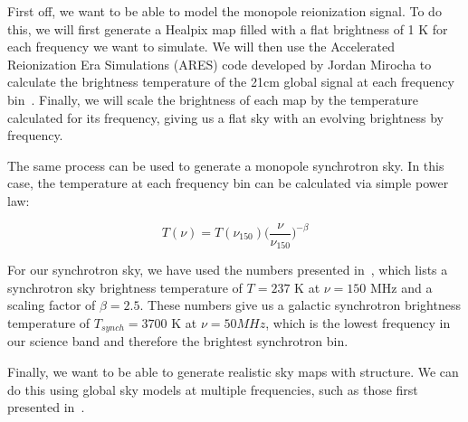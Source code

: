 First off, we want to be able to model the monopole reionization signal. To do 
this, we will first generate a Healpix map filled with a flat brightness of 1 K 
for each frequency we want to simulate. We will then use the Accelerated 
Reionization Era Simulations (ARES) code developed by Jordan Mirocha to 
calculate the brightness temperature of the 21cm global signal at each 
frequency bin~\citep{mirocha2014}. Finally, we will scale the brightness of 
each map by the temperature calculated for its frequency, giving us a flat sky 
with an evolving brightness by frequency.

The same process can be used to generate a monopole synchrotron sky. In this 
case, the temperature at each frequency bin can be calculated via simple power 
law:

\begin{equation}
    \label{eq:synch-temp}
    T(\nu) = T(\nu_{150}) \Big(\frac{\nu}{\nu_{150}} \Big)^{-\beta}
\end{equation}

For our synchrotron sky, we have used the numbers presented 
in~\cite{rogers2008}, which lists a synchrotron sky brightness temperature of 
$T = 237$ K at $\nu = 150$ MHz and a scaling factor of $\beta = 2.5$. These 
numbers give us a galactic synchrotron brightness temperature of $T_{synch} = 
3700$ K at $\nu = 50 MHz$, which is the lowest frequency in our science band 
and therefore the brightest synchrotron bin. 

Finally, we want to be able to generate realistic sky maps with structure. We 
can do this using global sky models at multiple frequencies, such as those 
first presented in~\cite{haslam1982}.
